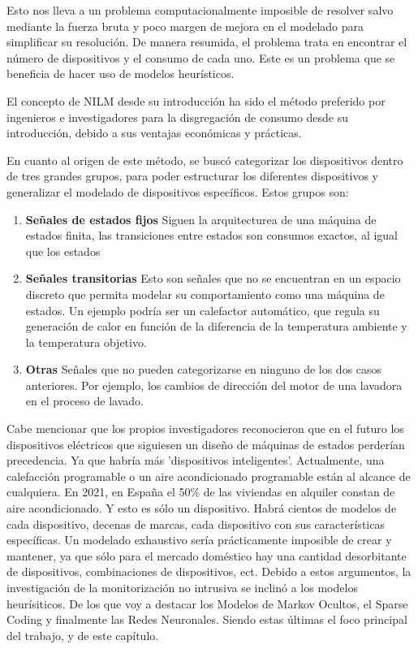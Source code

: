 Esto nos lleva a un problema computacionalmente imposible de resolver salvo mediante la fuerza bruta\autocite[4]{192069} y poco margen de mejora en el modelado para simplificar su resolución. De manera resumida, el problema trata en encontrar el número de dispositivos y el consumo de cada uno. 
Este es un problema que se beneficia de hacer uso de modelos heurísticos.

El concepto de NILM desde su introducción ha sido el método preferido por ingenieros e investigadores para la disgregación de consumo desde su introducción, debido a sus ventajas económicas y prácticas.\autocite[pág. 2, pár. 4]{Nalmpantis2019}

En cuanto al origen de este método, se buscó categorizar los dispositivos dentro de tres grandes grupos, para poder estructurar los diferentes dispositivos y generalizar el modelado de dispositivos específicos. 
Estos grupos son: 

\begin{enumerate}
\item \textbf{Señales de estados fijos} Siguen la arquitecturea de una máquina de estados finita, las transiciones entre estados son consumos exactos, al igual que los estados
\item \textbf{Señales transitorias} Esto son señales que no se encuentran en un espacio discreto que permita modelar su comportamiento como una máquina de estados. Un ejemplo podría ser un calefactor automático, que regula su generación de calor en función de la diferencia de la temperatura ambiente y la temperatura objetivo.
\item \textbf{Otras} Señales que no pueden categorizarse en ninguno de los dos casos anteriores. Por ejemplo, los cambios de dirección del motor de una lavadora en el proceso de lavado. 
\end{enumerate}

Cabe mencionar que los propios investigadores reconocieron que en el futuro los dispositivos eléctricos que siguiesen un diseño de máquinas de estados perderían precedencia. Ya que habría más 'dispositivos inteligentes'. Actualmente, una calefacción programable o un aire acondicionado programable están al alcance de cualquiera.
En 2021, en España el 50\% de las viviendas en alquiler constan de aire acondicionado\autocite{idealista2021}. 
Y esto es sólo un dispositivo. Habrá cientos de modelos de cada dispositivo, decenas de marcas, cada dispositivo con sus características específicas. Un modelado exhaustivo sería prácticamente imposible de crear y mantener, ya que sólo para el mercado doméstico hay una cantidad desorbitante de dispositivos, combinaciones de dispositivos, ect.
Debido a estos argumentos, la investigación de la monitorización no intrusiva se inclinó a los modelos heurísiticos. De los que voy a destacar los Modelos de Markov Ocultos, el Sparse Coding y finalmente las Redes Neuronales. Siendo estas últimas el foco principal del trabajo, y de este capítulo. 

